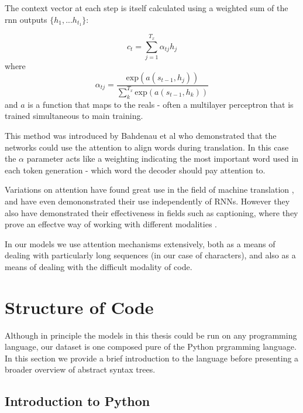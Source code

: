 The context vector at each step is itself calculated using a weighted sum of the rnn outputs $\{h_1,... h_{t_1}\}$:

\begin{equation}
c_t = \sum_{j=1}^{T_x}\alpha_{tj}h_j
\end{equation}
where
\begin{equation}
\alpha_{tj} = \dfrac{\text{exp}(a(s_{t-1}, h_j))}{\sum_k^{T_x}\text{exp}(a(s_{t-1}, h_k))}
\end{equation}
and $a$ is a function that maps to the reals - often a multilayer perceptron that is trained simultaneous to main training. 





This method was introduced by Bahdenau et al \cite{bahdanau_neural_2014} who demonstrated that the networks could use the attention to align words during translation.
In this case the $\alpha$ parameter acts like a weighting indicating the most important word used in each token generation - which word the decoder should pay attention to.

Variations on attention have found great use in the field of machine translation  \cite{luong_effective_2015}, and have even demononstrated their use independently of RNNs\cite{vaswani_attention_2017}. However they also have demonstrated their effectiveness in fields such as captioning, where they prove an effectve way of working with different modalities \cite{xu_show_2015}.

In our models we use attention mechanisms extensively, both as a means of dealing with particularly long sequences (in our case of characters), and also as a means of dealing with the difficult modality of code.




\section{Structure of Code} %
\label{sec:translating_code}

Although in principle the models in this thesis could be run on any programming language, our dataset is one composed pure of the Python prgramming language.  
In this section we provide a brief introduction to the language before presenting a broader overview of abstract syntax trees.

\subsection{Introduction to Python} %
\label{sub:function_declarations}


